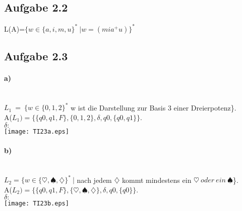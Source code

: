 \documentclass[11pt,a4paper]{article}
\begin{document}
\subsection*{Aufgabe 2.2}
L(A)=$\{w \in \{a,i,m,u\}^*~|w=(mia^+u)\}^*$
\subsection*{Aufgabe 2.3}
\paragraph*{a)}\ \\
$L_1~=~\{w \in \{0,1,2\}^*$ w ist die Darstellung zur Basis 3 einer Dreierpotenz\}.\\
A($L_1) = \{\{q0,q1,F\},\{0,1,2\},\delta,q0,\{q0,q1\}\}$.\\
$\delta:$\\
\texttt{[image: TI23a.eps]}
\paragraph*{b)}\ \\
$L_2=\{w \in \{\heartsuit,\spadesuit,\diamondsuit\}^*~|$ nach jedem $\diamondsuit$ kommt mindestens ein $\heartsuit~oder~ein~\spadesuit$\}.\\
A($L_2) = \{\{q0,q1,F\},\{\heartsuit,\spadesuit,\diamondsuit\},\delta,q0,\{q0\}\}$.\\
$\delta:$\\
\texttt{[image: TI23b.eps]}
\end{document}
